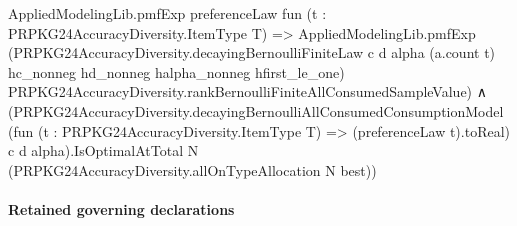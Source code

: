\documentclass[10pt]{article}
\begin{document}
\begin{ReviewVerbatim}
                  AppliedModelingLib.pmfExp preferenceLaw fun (t : PRPKG24AccuracyDiversity.ItemType T) =>
                    AppliedModelingLib.pmfExp
                      (PRPKG24AccuracyDiversity.decayingBernoulliFiniteLaw c d alpha (a.count t) hc_nonneg hd_nonneg
                        halpha_nonneg hfirst_le_one)
                      PRPKG24AccuracyDiversity.rankBernoulliFiniteAllConsumedSampleValue) ∧
              (PRPKG24AccuracyDiversity.decayingBernoulliAllConsumedConsumptionModel
                    (fun (t : PRPKG24AccuracyDiversity.ItemType T) => (preferenceLaw t).toReal) c d
                    alpha).IsOptimalAtTotal
                N (PRPKG24AccuracyDiversity.allOnTypeAllocation N best))
\end{ReviewVerbatim}

\paragraph{Retained governing declarations}
\end{document}

